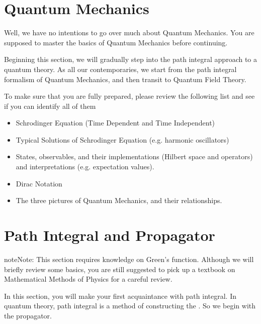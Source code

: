 \documentclass[letterpaper,10pt,english]{sphinxmanual}
\begin{document}
\section{Quantum Mechanics}
\label{\detokenize{pi_qm:quantum-mechanics}}\label{\detokenize{pi_qm::doc}}
Well, we have no intentions to go over much about Quantum Mechanics. You are supposed to master the basics of Quantum Mechanics before continuing.

Beginning this section, we will gradually step into the path integral approach to a quantum theory. As all our contemporaries, we start from the path integral formalism of Quantum Mechanics, and then transit to Quantum Field Theory.

To make sure that you are fully prepared, please review the following list and see if you can identify all of them
\begin{itemize}
\item {} 
Schrodinger Equation (Time Dependent and Time Independent)

\item {} 
Typical Solutions of Schrodinger Equation (e.g. harmonic oscillators)

\item {} 
States, observables, and their implementations (Hilbert space and operators) and interpretations (e.g. expectation values).

\item {} 
Dirac Notation

\item {} 
The three pictures of Quantum Mechanics, and their relationships.

\end{itemize}


\section{Path Integral and Propagator}
\label{\detokenize{pi_ppgt:path-integral-and-propagator}}\label{\detokenize{pi_ppgt::doc}}
\begin{sphinxadmonition}{note}{Note:}
This section requires knowledge on Green's function. Although we will briefly review some basics, you are still suggested to pick up a textbook on Mathematical Methods of Physics for a careful review.
\end{sphinxadmonition}

In this section, you will make your first acquaintance with path integral. In quantum theory, path integral is a method of constructing the . So we begin with the propagator.
\end{document}

